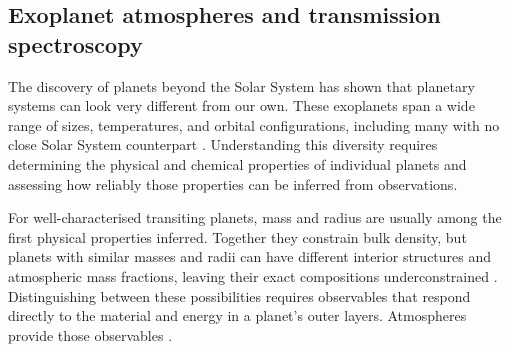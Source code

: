 \subsection{Exoplanet atmospheres and transmission spectroscopy}
\label{sec:atmospheres-transmission}
\label{sec:exoplanets-targets}
\label{sec:observing-atmospheres}

The discovery of planets beyond the Solar System has shown that planetary
systems can look very different from our own. These exoplanets span a wide
range of sizes, temperatures, and orbital configurations, including many with
no close Solar System counterpart \citep{WinnFabrycky2015}. Understanding this
diversity requires determining the physical and chemical properties of
individual planets and assessing how reliably those properties can be inferred
from observations.

For well-characterised transiting planets, mass and radius are usually among
the first physical properties inferred. Together they constrain bulk density,
but planets with similar masses and radii can have different interior
structures and atmospheric mass fractions, leaving their exact compositions
underconstrained
\citep{RogersSeager2010}. Distinguishing between these possibilities requires
observables that respond directly to the material and energy in a planet's
outer layers. Atmospheres provide those observables
\citep{Madhusudhan2019}.

